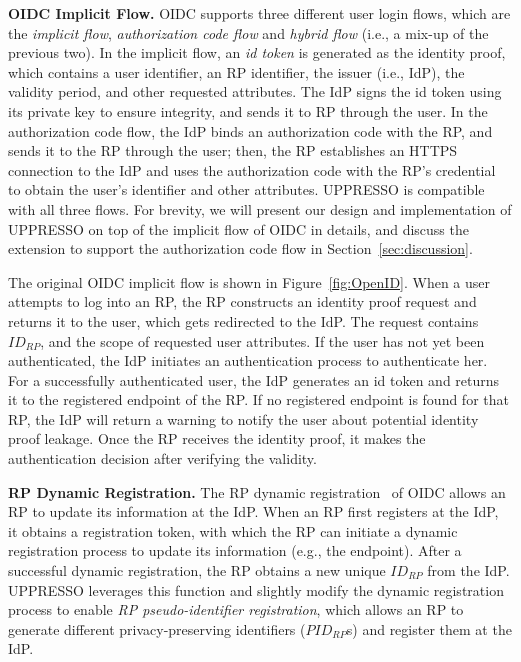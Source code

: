 \vspace{1mm}\noindent\textbf{OIDC Implicit Flow.}
 OIDC supports three different user login flows, which are the {\em implicit flow}, {\em authorization code flow} and {\em hybrid flow} (i.e., a mix-up of the previous two).
 In the implicit flow, an {\em id token} is generated as the identity proof, which contains a user identifier, an RP identifier,
    the issuer (i.e., IdP), the validity period, and other requested attributes.
The IdP signs the id token using its private key to ensure integrity, and sends it to RP through the user.
In the authorization code flow, the IdP binds an authorization code with the RP, and sends it to the RP through the user;
then, the RP establishes an HTTPS connection to the IdP %
    and uses the authorization code with the RP's credential to obtain the user's identifier and other attributes.
UPPRESSO is compatible with all three flows. For brevity, we will present our design and implementation of UPPRESSO on top of the implicit flow of OIDC in details, and discuss the extension to support the authorization code flow in Section~\ref{sec:discussion}.

The original OIDC implicit flow is shown in Figure~\ref{fig:OpenID}. When a user attempts to log into an RP,
    the RP constructs an identity proof request and returns it to the user, which gets redirected to the IdP.
The request contains $ID_{RP}$, and the scope of requested user attributes.
If the user has not yet been authenticated, the IdP initiates an authentication process to authenticate her.
For a successfully authenticated user, the IdP generates an id token  and returns it to the registered endpoint of the RP.
If no registered endpoint is found for that RP,
    the IdP will return a warning to notify the user about potential identity proof leakage.
Once the RP receives the identity proof, it makes the authentication decision after verifying the validity.

\vspace{1mm}\noindent\textbf{RP Dynamic Registration.} The RP dynamic registration~\cite{DynamicRegistration} of OIDC allows an RP to update its information at the IdP. When an RP first registers at the IdP, it obtains a registration token, with which the RP can initiate a dynamic registration process to update its information (e.g., the endpoint).
After a successful dynamic registration, the RP obtains a new unique $ID_{RP}$ from the IdP.
UPPRESSO leverages this function and slightly modify the dynamic registration process to enable {\em RP pseudo-identifier registration},
 which allows an RP to generate different privacy-preserving identifiers ($PID_{RP}$s) and register them at the IdP.

